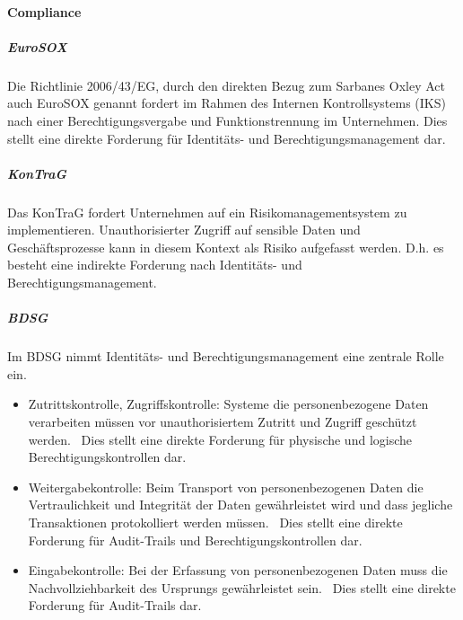\documentclass[12pt]{article}
\begin{document}
\paragraph{Compliance}
\subparagraph{EuroSOX}
Die Richtlinie 2006/43/EG, durch den direkten Bezug zum Sarbanes Oxley Act auch EuroSOX genannt fordert im Rahmen des Internen Kontrollsystems (IKS) nach einer Berechtigungsvergabe und Funktionstrennung im Unternehmen. Dies stellt eine direkte Forderung für Identitäts- und Berechtigungsmanagement dar.~\cite{conta2017leitfaden}
\subparagraph{KonTraG}
Das KonTraG fordert Unternehmen auf ein Risikomanagementsystem zu implementieren. Unauthorisierter Zugriff auf sensible Daten und Geschäftsprozesse kann in diesem Kontext als Risiko aufgefasst werden. D.h. es besteht eine indirekte Forderung nach Identitäts- und Berechtigungsmanagement.~\cite{conta2017leitfaden}
\subparagraph{BDSG}
Im BDSG nimmt Identitäts- und Berechtigungsmanagement eine zentrale Rolle ein.
\begin{itemize}
  \item Zutrittskontrolle, Zugriffskontrolle: Systeme die personenbezogene Daten verarbeiten müssen vor unauthorisiertem Zutritt und Zugriff geschützt werden.~\cite{conta2017leitfaden} Dies stellt eine direkte Forderung für physische und logische Berechtigungskontrollen dar.
  \item Weitergabekontrolle: Beim Transport von personenbezogenen Daten die Vertraulichkeit und Integrität der Daten gewährleistet wird und dass jegliche Transaktionen protokolliert werden müssen.~\cite{conta2017leitfaden} Dies stellt eine direkte Forderung für Audit-Trails und Berechtigungskontrollen dar.
  \item Eingabekontrolle: Bei der Erfassung von personenbezogenen Daten muss die Nachvollziehbarkeit des Ursprungs gewährleistet sein.~\cite{conta2017leitfaden} Dies stellt eine direkte Forderung für Audit-Trails dar.
\end{itemize}
\end{document}
